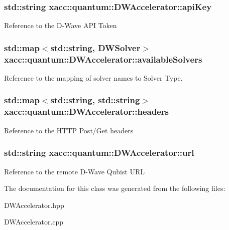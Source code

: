 \subsubsection[{\texorpdfstring{api\+Key}{apiKey}}]{\setlength{\rightskip}{0pt plus 5cm}std\+::string xacc\+::quantum\+::\+D\+W\+Accelerator\+::api\+Key\hspace{0.3cm}{\ttfamily [protected]}}\hypertarget{a00029_a6b9ca421d7efeed09ff9acb9f77d9dd8}{}\label{a00029_a6b9ca421d7efeed09ff9acb9f77d9dd8}
Reference to the D-\/\+Wave A\+PI Token 
\subsubsection[{\texorpdfstring{available\+Solvers}{availableSolvers}}]{\setlength{\rightskip}{0pt plus 5cm}std\+::map$<$std\+::string, {\bf D\+W\+Solver}$>$ xacc\+::quantum\+::\+D\+W\+Accelerator\+::available\+Solvers\hspace{0.3cm}{\ttfamily [protected]}}\hypertarget{a00029_ac19954e3df9e77184717c9be8a2ed4c5}{}\label{a00029_ac19954e3df9e77184717c9be8a2ed4c5}
Reference to the mapping of solver names to Solver Type. 
\subsubsection[{\texorpdfstring{headers}{headers}}]{\setlength{\rightskip}{0pt plus 5cm}std\+::map$<$std\+::string, std\+::string$>$ xacc\+::quantum\+::\+D\+W\+Accelerator\+::headers\hspace{0.3cm}{\ttfamily [protected]}}\hypertarget{a00029_a031df31e3ff84f33ea9a76bfc0f9277c}{}\label{a00029_a031df31e3ff84f33ea9a76bfc0f9277c}
Reference to the H\+T\+TP Post/\+Get headers 
\subsubsection[{\texorpdfstring{url}{url}}]{\setlength{\rightskip}{0pt plus 5cm}std\+::string xacc\+::quantum\+::\+D\+W\+Accelerator\+::url\hspace{0.3cm}{\ttfamily [protected]}}\hypertarget{a00029_a934db80f3cf6aa68158a66bc053c0c27}{}\label{a00029_a934db80f3cf6aa68158a66bc053c0c27}
Reference to the remote D-\/\+Wave Qubist U\+RL 

The documentation for this class was generated from the following files\+:\begin{DoxyCompactItemize}
\item 
D\+W\+Accelerator.\+hpp\item 
D\+W\+Accelerator.\+cpp\end{DoxyCompactItemize}

